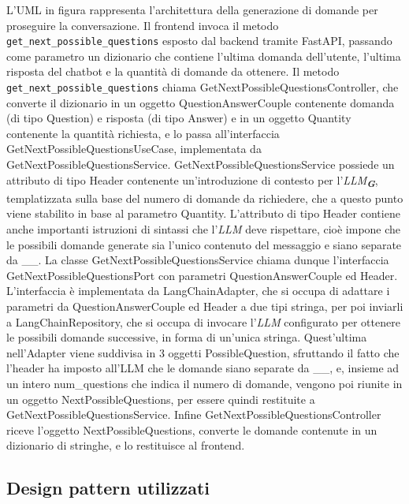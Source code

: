 L'UML in figura rappresenta l'architettura della generazione di domande per proseguire la conversazione.
Il frontend invoca il metodo \texttt{get\_next\_possible\_questions} esposto dal backend tramite FastAPI, passando come parametro un dizionario che contiene l'ultima domanda dell'utente, l'ultima risposta del chatbot e la quantità di domande da ottenere.
Il metodo \texttt{get\_next\_possible\_questions} chiama GetNextPossibleQuestionsController, che converte il dizionario in un oggetto QuestionAnswerCouple contenente domanda (di tipo Question) e risposta (di tipo Answer) e in un oggetto Quantity contenente la quantità richiesta, e lo passa all'interfaccia GetNextPossibleQuestionsUseCase, implementata da GetNextPossibleQuestionsService.
GetNextPossibleQuestionsService possiede un attributo di tipo Header contenente un'introduzione di contesto per l'\emph{LLM}\textsubscript{\textbf{\textit{G}}}, templatizzata sulla base del numero di domande da richiedere, che a questo punto viene stabilito in base al parametro Quantity. L'attributo di tipo Header contiene anche importanti istruzioni di sintassi che l'\emph{LLM} deve rispettare, cioè impone che le possibili domande generate sia l'unico contenuto del messaggio e siano separate da \_\_. La classe GetNextPossibleQuestionsService chiama dunque l'interfaccia GetNextPossibleQuestionsPort con parametri QuestionAnswerCouple ed Header.
L'interfaccia è implementata da LangChainAdapter, che si occupa di adattare i parametri da QuestionAnswerCouple ed Header a due tipi stringa, per poi inviarli a LangChainRepository, che si occupa di invocare l'\emph{LLM} configurato per ottenere le possibili domande successive, in forma di un'unica stringa. Quest'ultima nell'Adapter viene suddivisa in 3 oggetti PossibleQuestion, sfruttando il fatto che l'header ha imposto all'LLM che le domande siano separate da \_\_, e, insieme ad un intero num\_questions che indica il numero di domande, vengono poi riunite in un oggetto NextPossibleQuestions, per essere quindi restituite a GetNextPossibleQuestionsService.
Infine GetNextPossibleQuestionsController riceve l'oggetto NextPossibleQuestions, converte le domande contenute in un dizionario di stringhe, e lo restituisce al frontend.

\newpage



\subsection{Design pattern utilizzati}
\label{sec:design_pattern_utilizzati}


